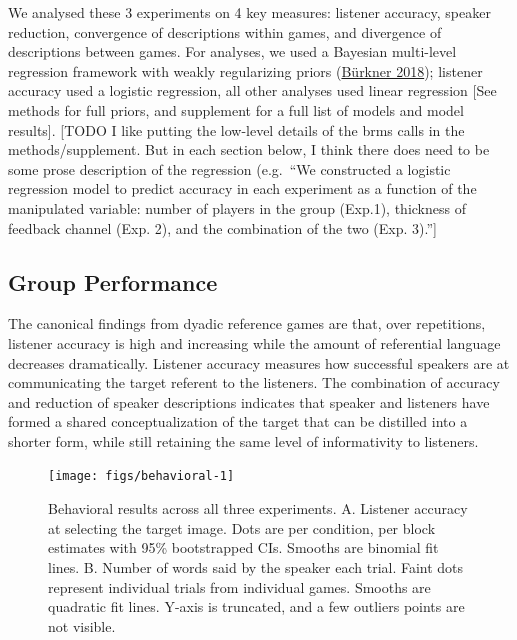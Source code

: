\documentclass[
  english,
  a4paper,
]{article}
\begin{document}
We analysed these 3 experiments on 4 key measures: listener accuracy, speaker reduction, convergence of descriptions within games, and divergence of descriptions between games. For analyses, we used a Bayesian multi-level regression framework with weakly regularizing priors (\protect\hyperlink{ref-burkner2018}{Bürkner 2018}); listener accuracy used a logistic regression, all other analyses used linear regression {[}See methods for full priors, and supplement for a full list of models and model results{]}. {[}TODO I like putting the low-level details of the brms calls in the methods/supplement. But in each section below, I think there does need to be some prose description of the regression (e.g.~``We constructed a logistic regression model to predict accuracy in each experiment as a function of the manipulated variable: number of players in the group (Exp.1), thickness of feedback channel (Exp. 2), and the combination of the two (Exp. 3).''{]}

\hypertarget{group-performance}{%
\subsection{Group Performance}\label{group-performance}}

The canonical findings from dyadic reference games are that, over repetitions, listener accuracy is high and increasing while the amount of referential language decreases dramatically. Listener accuracy measures how successful speakers are at communicating the target referent to the listeners. The combination of accuracy and reduction of speaker descriptions indicates that speaker and listeners have formed a shared conceptualization of the target that can be distilled into a shorter form, while still retaining the same level of informativity to listeners.

\begin{figure}[t!]

{\centering \texttt{[image: figs/behavioral-1]} 

}

\caption{Behavioral results across all three experiments. A. Listener accuracy at selecting the target image. Dots are per condition, per block estimates with 95\% bootstrapped CIs. Smooths are binomial fit lines. B. Number of words said by the speaker each trial. Faint dots represent individual trials from individual games. Smooths are quadratic fit lines. Y-axis is truncated, and a few outliers points are not visible. }\label{fig:behavioral}
\end{figure}
\end{document}
